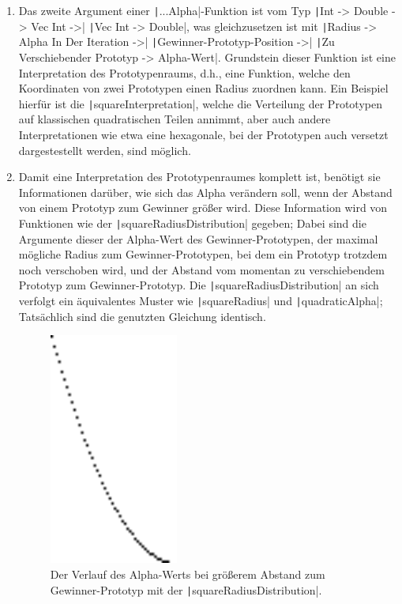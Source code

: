 \documentclass[twoside,a4paper]{article}
\newcommand{\haskell}[1]{\texttt|#1|}
\begin{document}
\begin{enumerate}
\item Das zweite Argument einer \haskell{...Alpha}-Funktion ist vom Typ \haskell{Int -> Double -> Vec Int ->} \haskell{Vec Int -> Double}, was gleichzusetzen ist mit \haskell{Radius -> Alpha In Der Iteration ->} \haskell{Gewinner-Prototyp-Position ->} \haskell{Zu Verschiebender Prototyp -> Alpha-Wert}. Grundstein dieser Funktion ist eine Interpretation des Prototypenraums, d.h., eine Funktion, welche den Koordinaten von zwei Prototypen einen Radius zuordnen kann. Ein Beispiel hierfür ist die \haskell{squareInterpretation}, welche die Verteilung der Prototypen auf klassischen quadratischen Teilen annimmt, aber auch andere Interpretationen wie etwa eine hexagonale, bei der Prototypen auch versetzt dargestestellt werden, sind möglich.

\item Damit eine Interpretation des Prototypenraumes komplett ist, benötigt sie Informationen darüber, wie sich das Alpha verändern soll, wenn der Abstand von einem Prototyp zum Gewinner größer wird. Diese Information wird von Funktionen wie der \haskell{squareRadiusDistribution} gegeben; Dabei sind die Argumente dieser der Alpha-Wert des Gewinner-Prototypen, der maximal mögliche Radius zum Gewinner-Prototypen, bei dem ein Prototyp trotzdem noch verschoben wird, und der Abstand vom momentan zu verschiebendem Prototyp zum Gewinner-Prototyp. Die \haskell{squareRadiusDistribution} an sich verfolgt ein äquivalentes Muster wie \haskell{squareRadius} und \haskell{quadraticAlpha}; Tatsächlich sind die genutzten Gleichung identisch.

\begin{figure}
\centering
\includegraphics[width=0.4\textwidth,height=0.2\textheight,keepaspectratio]{src/sqRadDistr.png}
\caption{Der Verlauf des Alpha-Werts bei größerem Abstand zum Gewinner-Prototyp mit der \haskell{squareRadiusDistribution}.}
\end{figure}
\end{enumerate}
\end{document}
